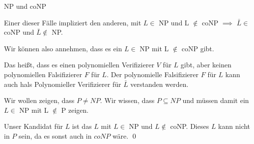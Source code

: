 \documentclass[answers]{submit}
\begin{document}
\begin{exercise}[12]{NP und coNP}
{\begin{enumerate}
            Einer dieser Fälle impliziert den anderen, mit $L\in$ NP und L $\notin$ coNP $\implies$ $\bar L\in$ coNP und $\bar L\notin$ NP.

            Wir können also annehmen, dass es ein $L\in$ NP mit L $\notin$ coNP gibt.

            Das heißt, dass es einen polynomiellen Verifizierer $V$ für $L$ gibt, aber keinen polynomiellen Falsifizierer $F$ für $L$.
            Der polynomielle Falsifizierer $F$ für $L$ kann auch hals Polynomieller Verifizierer für $\bar L$ verstanden werden.

            Wir wollen zeigen, dass $P\neq NP$. Wir wissen, dass $P\subseteq NP$ und müssen damit ein $L\in$ NP mit L $\notin$ P zeigen.

            Unser Kandidat für $L$ ist das $L$ mit $L\in$ NP und $L \notin$ coNP. Dieses $L$ kann nicht in $P$ sein, da es sonst auch in $coNP$ wäre.
            \qed
    \end{enumerate}
  }
\end{exercise}
\end{document}
